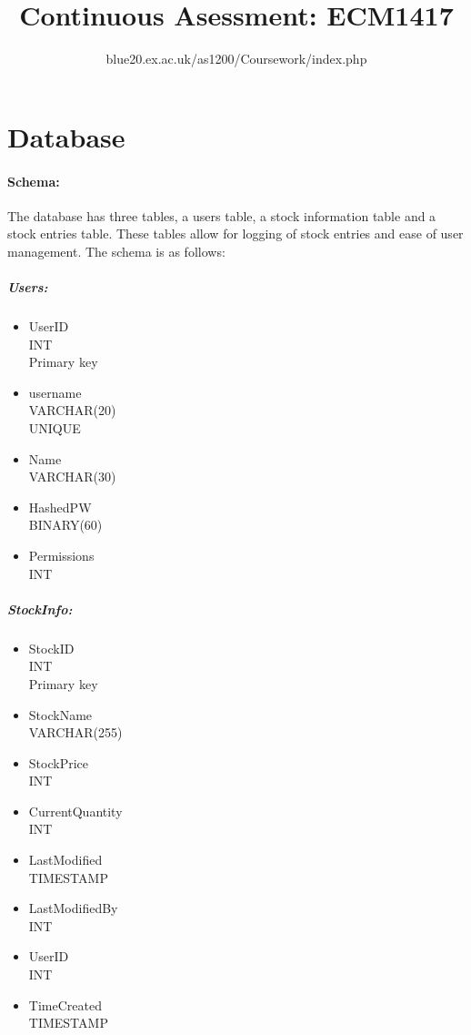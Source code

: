 \documentclass[12pt,a4paper]{report}
\title{Continuous Asessment: ECM1417}
\author{blue20.ex.ac.uk/as1200/Coursework/index.php}
\begin{document}
	\maketitle
	\newpage
	\section{Database}
	\paragraph{Schema:}
	The database has three tables, a users table, a stock information table and a stock entries table. These tables allow for logging of stock entries and ease of user management. The schema is as follows:
	\begin{multicols}{3}
	\subparagraph{Users:}
	\begin{itemize}
		\item UserID \\ INT \\ Primary key
		\item username \\ VARCHAR(20) \\ UNIQUE
		\item Name \\ VARCHAR(30)
		\item HashedPW \\ BINARY(60)
		\item Permissions \\ INT
	\end{itemize}
	\columnbreak
	\subparagraph{StockInfo:}
	\begin{itemize}
		\item StockID \\ INT \\ Primary key
		\item StockName \\ VARCHAR(255)
		\item StockPrice \\ INT
		\item CurrentQuantity \\ INT
		\item LastModified \\ TIMESTAMP
		\item LastModifiedBy \\ INT
		\item UserID \\ INT
		\item TimeCreated \\ TIMESTAMP

\end{itemize}
\end{multicols}
\end{document}
